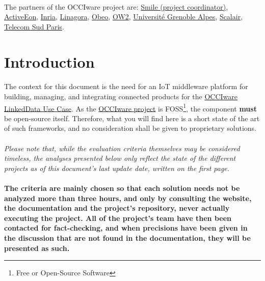 \documentclass{article}
\begin{document}
\paragraph{} The partners of the OCCIware project are: \href{http://www.smile.fr/}{Smile (project coordinator)}, \href{https://www.activeeon.com/}{ActiveEon}, \href{https://www.inria.fr/en/}{Inria}, \href{https://linagora.com/}{Linagora}, \href{https://www.obeo.fr/en/}{Obeo}, \href{https://www.ow2.org/bin/view/Main/}{OW2}, \href{Université Grenoble Alpes}{Université Grenoble Alpes}, \href{https://www.scalair.fr/}{Scalair}, \href{http://www.telecom-sudparis.eu/}{Telecom Sud Paris}.

\newpage

\tableofcontents

\newpage

\section*{Introduction}
%

\paragraph{} The context for this document is the need for an IoT middleware platform for building, managing, and integrating connected products for the \href{https://github.com/occiware/occiware-ozwillo}{OCCIware LinkedData Use Case}. As the \href{http://www.occiware.org/bin/view/Main/}{OCCIware project} is FOSS\footnote{Free or Open-Source Software}, the component \textbf{must} be open-source itself. Therefore, what you will find here is a short state of the art of such frameworks, and no consideration shall be given to proprietary solutions.

\paragraph{} \emph{Please note that, while the evaluation criteria themselves may be considered timeless, the analyses presented below only reflect the state of the different projects as of this document's last update date, written on the first page.}

\paragraph{} \textbf{The criteria are mainly chosen so that each solution needs not be analyzed more than three hours, and only by consulting the website, the documentation and the project's repository, never actually executing the project. All of the project's team have then been contacted for fact-checking, and when precisions have been given in the discussion that are not found in the documentation, they will be presented as such.}
\end{document}

